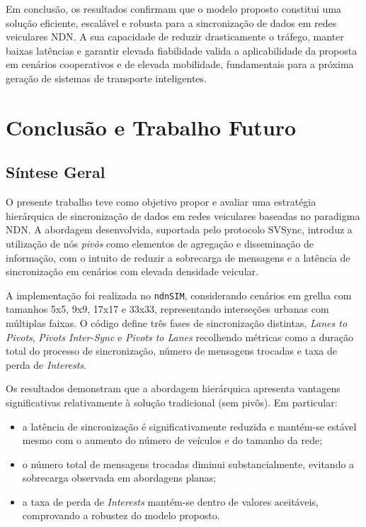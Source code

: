 Em conclusão, os resultados confirmam que o modelo proposto constitui uma solução eficiente, escalável e robusta para a sincronização de dados em redes veiculares \gls{NDN}. A sua capacidade de reduzir drasticamente o tráfego, manter baixas latências e garantir elevada fiabilidade valida a aplicabilidade da proposta em cenários cooperativos e de elevada mobilidade, fundamentais para a próxima geração de sistemas de transporte inteligentes.


\chapter{Conclusão e Trabalho Futuro}

\section{Síntese Geral}
O presente trabalho teve como objetivo propor e avaliar uma estratégia hierárquica de sincronização de dados em redes veiculares baseadas no paradigma \gls{NDN}. A abordagem desenvolvida, suportada pelo protocolo \gls{SVSync}, introduz a utilização de nós \textit{pivôs} como elementos de agregação e disseminação de informação, com o intuito de reduzir a sobrecarga de mensagens e a latência de sincronização em cenários com elevada densidade veicular.

A implementação foi realizada no \texttt{ndnSIM}, considerando cenários em grelha com tamanhos 5x5, 9x9, 17x17 e 33x33, representando interseções urbanas com múltiplas faixas. O código define três fases de sincronização distintas, \textit{Lanes to Pivots}, \textit{Pivots Inter-Sync} e \textit{Pivots to Lanes} recolhendo métricas como a duração total do processo de sincronização, número de mensagens trocadas e taxa de perda de \textit{Interests}.

Os resultados demonstram que a abordagem hierárquica apresenta vantagens significativas relativamente à solução tradicional (sem pivôs). Em particular:
\begin{itemize}
\item a latência de sincronização é significativamente reduzida e mantém-se estável mesmo com o aumento do número de veículos e do tamanho da rede;
\item o número total de mensagens trocadas diminui substancialmente, evitando a sobrecarga observada em abordagens planas;
\item a taxa de perda de \textit{Interests} mantém-se dentro de valores aceitáveis, comprovando a robustez do modelo proposto.
\end{itemize}

